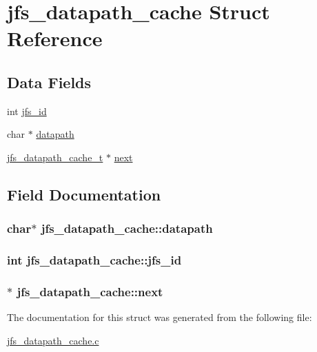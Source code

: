 \hypertarget{structjfs__datapath__cache}{
\section{jfs\_\-datapath\_\-cache Struct Reference}
\label{structjfs__datapath__cache}
}
\subsection*{Data Fields}
\begin{DoxyCompactItemize}
\item 
int \hyperlink{structjfs__datapath__cache_af8298a33f2cbe062718efb1bf82f5072}{jfs\_\-id}
\item 
char $\ast$ \hyperlink{structjfs__datapath__cache_a6c3d15ce5899a875e23cbda68854d1be}{datapath}
\item 
\hyperlink{structjfs__datapath__cache}{jfs\_\-datapath\_\-cache\_\-t} $\ast$ \hyperlink{structjfs__datapath__cache_a9cf1b7d002dd0907da7a69b055a957f1}{next}
\end{DoxyCompactItemize}


\subsection{Field Documentation}
\hypertarget{structjfs__datapath__cache_a6c3d15ce5899a875e23cbda68854d1be}{
\subsubsection[{datapath}]{\setlength{\rightskip}{0pt plus 5cm}char$\ast$ {\bf jfs\_\-datapath\_\-cache::datapath}}}
\label{structjfs__datapath__cache_a6c3d15ce5899a875e23cbda68854d1be}
\hypertarget{structjfs__datapath__cache_af8298a33f2cbe062718efb1bf82f5072}{
\subsubsection[{jfs\_\-id}]{\setlength{\rightskip}{0pt plus 5cm}int {\bf jfs\_\-datapath\_\-cache::jfs\_\-id}}}
\label{structjfs__datapath__cache_af8298a33f2cbe062718efb1bf82f5072}
\hypertarget{structjfs__datapath__cache_a9cf1b7d002dd0907da7a69b055a957f1}{
\subsubsection[{next}]{$\ast$ {\bf jfs\_\-datapath\_\-cache::next}}}
\label{structjfs__datapath__cache_a9cf1b7d002dd0907da7a69b055a957f1}


The documentation for this struct was generated from the following file:\begin{DoxyCompactItemize}
\item 
\hyperlink{jfs__datapath__cache_8c}{jfs\_\-datapath\_\-cache.c}\end{DoxyCompactItemize}
